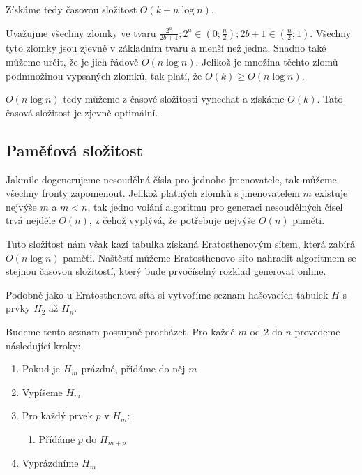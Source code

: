 \documentclass{article}
\begin{document}
Získáme tedy časovou složitost $O\left(k + n \log{n}\right)$.

Uvažujme všechny zlomky ve tvaru $\frac{2^a}{2b+1}; 2^a \in \left(0; \frac{n}{2}\right); 2b+1 \in \left(\frac{n}{2}; 1\right)$. Všechny tyto zlomky jsou zjevně v základním tvaru a menší než jedna. Snadno také můžeme určit, že je jich řádově $O\left(n \log{n}\right)$. Jelikož je množina těchto zlomů podmnožinou vypsaných zlomků, tak platí, že $O\left(k\right) \geq O\left(n \log{n}\right)$.

$O\left(n \log{n}\right)$ tedy můžeme z časové složitosti vynechat a získáme $O\left(k\right)$. Tato časová složitost je zjevně optimální.

\subsection{Paměťová složitost}
\label{section:memory}

Jakmile dogenerujeme nesoudělná čísla pro jednoho jmenovatele, tak můžeme všechny fronty zapomenout. Jelikož platných zlomků s jmenovatelem $m$ existuje nejvýše $m$ a $m < n$, tak jedno volání algoritmu pro generaci nesoudělných čísel trvá nejdéle $O\left(n\right)$, z čehož vyplývá, že potřebuje nejvýše $O\left(n\right)$ paměti.

Tuto složitost nám však kazí tabulka získaná Eratosthenovým sítem, která zabírá $O\left(n \log{n}\right)$ paměti. Naštěstí můžeme Eratosthenovo síto nahradit algoritmem se stejnou časovou složitostí, který bude prvočíselný rozklad generovat online.

Podobně jako u Eratosthenova síta si vytvoříme seznam hašovacích tabulek $H$ s prvky $H_2$ až $H_n$.

Budeme tento seznam postupně procházet. Pro každé $m$ od $2$ do $n$ provedeme následující kroky:

\begin{enumerate}
    \item Pokud je $H_m$ prázdné, přidáme do něj $m$
    \item Vypíšeme $H_m$
    \item Pro každý prvek $p$ v $H_m$:
          \begin{enumerate}[label*=\arabic*.]
              \item Přídáme $p$ do $H_{m+p}$
          \end{enumerate}
    \item Vyprázdníme $H_m$
\end{enumerate}
\end{document}
